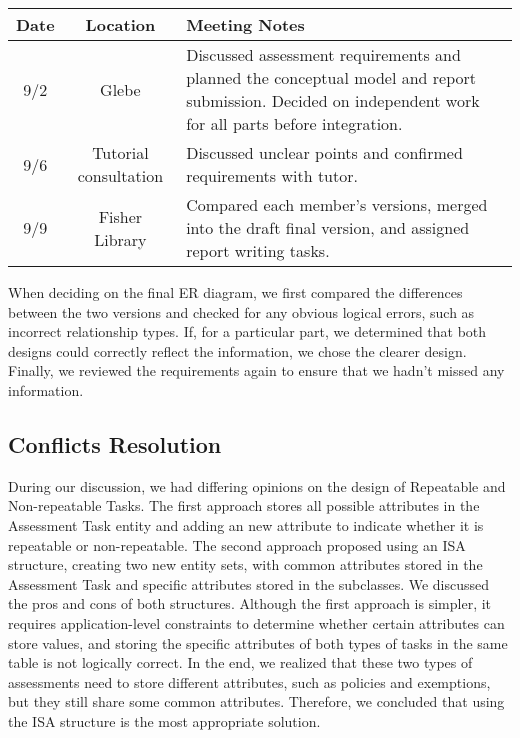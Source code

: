 \documentclass[a4paper,12pt]{article}
\begin{document}
\begin{table}[h!]
\centering
\begin{tabular}{|c|c|p{10cm}|}
\hline
\textbf{Date} & \textbf{Location}    & \textbf{Meeting Notes}                                                                                                    \\ \hline
9/2           & Glebe                & Discussed assessment requirements and planned the conceptual model and report submission. Decided on independent work for all parts before integration. \\ \hline
9/6           & Tutorial consultation & Discussed unclear points and confirmed requirements with tutor.                                                           \\ \hline
9/9           & Fisher Library        & Compared each member’s versions, merged into the draft final version, and assigned report writing tasks.                   \\ \hline
\end{tabular}
\end{table}

When deciding on the final ER diagram, we first compared the differences between the two versions and checked for any obvious logical errors, such as incorrect relationship types. If, for a particular part, we determined that both designs could correctly reflect the information, we chose the clearer design. Finally, we reviewed the requirements again to ensure that we hadn't missed any information.


\subsection*{Conflicts Resolution}

During our discussion, we had differing opinions on the design of Repeatable and Non-repeatable Tasks. The first approach stores all possible attributes in the Assessment Task entity and adding an new attribute to indicate whether it is repeatable or non-repeatable. The second approach proposed using an ISA structure, creating two new entity sets, with common attributes stored in the Assessment Task and specific attributes stored in the subclasses. We discussed the pros and cons of both structures. Although the first approach is simpler, it requires application-level constraints to determine whether certain attributes can store values, and storing the specific attributes of both types of tasks in the same table is not logically correct. In the end, we realized that these two types of assessments need to store different attributes, such as policies and exemptions, but they still share some common attributes. Therefore, we concluded that using the ISA structure is the most appropriate solution.
\end{document}
